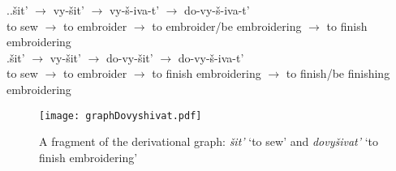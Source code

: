 \ex.\label{deriv:dovyshivat}\ag.\label{deriv:dovyshivat1}\v{s}it'\textsuperscript{\IPF} $\rightarrow$ vy-\v{s}it'\textsuperscript{\PF} $\rightarrow$ vy-\v{s}-iva-t'\textsuperscript{\IPF} $\rightarrow$ do-vy-\v{s}-iva-t'\textsuperscript{\PF}\\
{to sew} $\rightarrow$ {to embroider} $\rightarrow$ {to embroider/be embroidering} $\rightarrow$ {to finish embroidering}\\
\bg.\label{deriv:dovyshivat2}\v{s}it'\textsuperscript{\IPF} $\rightarrow$ vy-\v{s}it'\textsuperscript{\PF} $\rightarrow$ do-vy-\v{s}it'\textsuperscript{\PF} $\rightarrow$ do-vy-\v{s}-iva-t'\textsuperscript{\IPF}\\
{to sew} $\rightarrow$ {to embroider} $\rightarrow$ {to finish embroidering} $\rightarrow$ {to finish/be finishing embroidering}\\

\begin{figure}
\begin{center}
\texttt{[image: graphDovyshivat.pdf]}
\caption{A fragment of the derivational graph: \textit{\v{s}it'} `to sew' and \textit{dovy\v{s}ivat'} `to finish embroidering'\label{tree:dovyshivat}}
\end{center}
\end{figure}		

